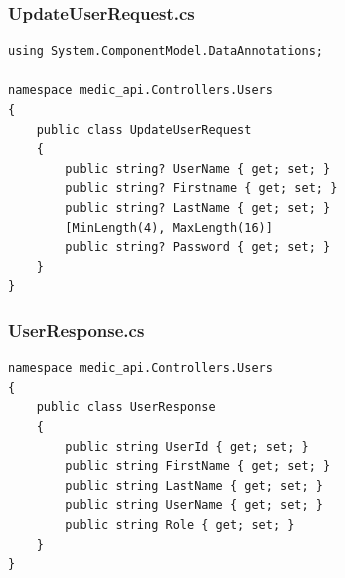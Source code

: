 \documentclass[12pt,a4paper]{article}
\begin{document}
	\subsubsection{UpdateUserRequest.cs}
	\begin{lstlisting}
using System.ComponentModel.DataAnnotations;

namespace medic_api.Controllers.Users
{
    public class UpdateUserRequest
    {
        public string? UserName { get; set; }
        public string? Firstname { get; set; }
        public string? LastName { get; set; }
        [MinLength(4), MaxLength(16)]
        public string? Password { get; set; }
    }
}
	\end{lstlisting}
	\subsubsection{UserResponse.cs}
	\begin{lstlisting}
namespace medic_api.Controllers.Users
{
    public class UserResponse
    {
        public string UserId { get; set; }
        public string FirstName { get; set; }
        public string LastName { get; set; }
        public string UserName { get; set; }
        public string Role { get; set; }
    }
}
	\end{lstlisting}
\end{document}
